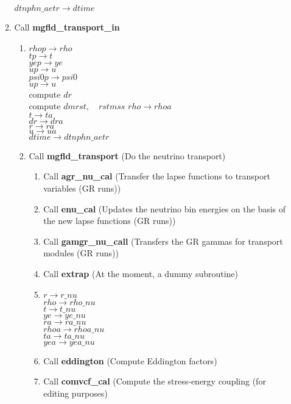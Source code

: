 \documentclass[11pt,doublespace]{article}
\begin{document}
\begin{itemize}
\begin{enumerate}
           $dtnphn\_aetr \rightarrow dtime$
  \item Call {\bf mgfld\_transport\_in}
\begin{enumerate}
  \item $rhop \rightarrow rho$\\
          $tp \rightarrow t$\\
           $yep \rightarrow ye$\\
           $up \rightarrow u$\\
           $psi0p \rightarrow psi0$\\
           $up \rightarrow u$\\
           compute $dr$\\
           compute $dmrst, \quad rstmss$
           $rho \rightarrow rhoa$\\
           $t \rightarrow ta$\\
           $dr \rightarrow dra$\\
           $r \rightarrow ra$\\
           $u \rightarrow ua$\\
           $dtime \rightarrow dtnphn\_aetr$
  \item Call {\bf mgfld\_transport} (Do the neutrino transport)
\begin{enumerate}
  \item Call {\bf agr\_nu\_cal} (Transfer the lapse functions to transport variables (GR runs))
  \item Call {\bf enu\_cal} (Updates the neutrino bin energies on the basis of the new lapse functions (GR runs))
  \item Call {\bf gamgr\_nu\_call} (Transfers the GR gammas for transport modules (GR runs))
  \item Call {\bf extrap} (At the moment, a dummy subroutine)
  \item $r \rightarrow r\_nu$\\
           $rho \rightarrow rho\_nu$\\
           $t      \rightarrow t\_nu$\\
           $ye   \rightarrow ye\_nu$\\
           $ra   \rightarrow ra\_nu$\\
           $rhoa   \rightarrow rhoa\_nu$\\
           $ta   \rightarrow ta\_nu$\\
           $yea   \rightarrow yea\_nu$
  \item Call {\bf eddington} (Compute Eddington factors)
  \item Call {\bf comvcf\_cal} (Compute the stress-energy coupling (for editing purposes)

\end{enumerate}
\end{enumerate}
\end{enumerate}
\end{itemize}
\end{document}

